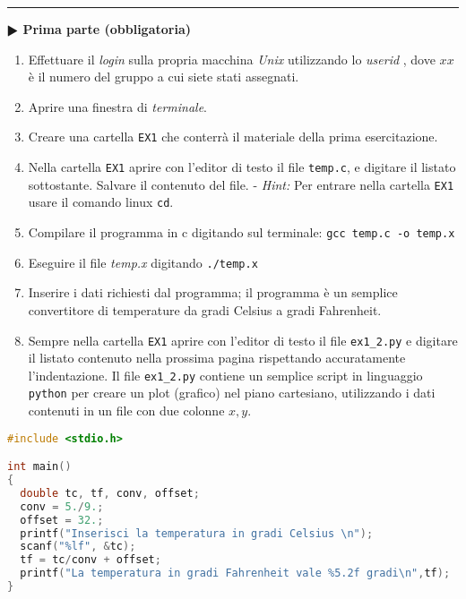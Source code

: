 \documentclass[11pt]{article}
\begin{document}
\hrule
\vspace{2mm}
\textbf{$\RHD$ Prima parte (obbligatoria)} 
\begin{enumerate}
\item Effettuare il {\em login\/} sulla propria macchina {\em Unix\/} utilizzando lo {\em userid\/} \texttt{\login}, 
dove $xx$ \`e il numero del gruppo a cui siete stati assegnati.
\item Aprire una finestra di {\em terminale}.
\item Creare una cartella  \texttt{EX1} che conterr\`a il materiale della prima esercitazione.
\item Nella cartella \texttt{EX1} aprire con l'editor di testo il file \texttt{temp.c}, e digitare il listato sottostante. Salvare il contenuto del file. - {\em Hint:} Per entrare nella cartella \texttt{EX1} usare il comando linux \texttt{cd}.

\item Compilare il programma in c digitando sul terminale:
  \texttt{gcc temp.c -o temp.x}
\item Eseguire il file {\em temp.x\/} digitando \texttt{./temp.x}
\item Inserire i dati richiesti dal programma; il programma \`e un semplice convertitore di temperature da gradi Celsius a gradi Fahrenheit.
\item Sempre nella cartella \texttt{EX1} aprire con l'editor di testo il file \texttt{ex1\_2.py} e digitare il listato
  contenuto nella prossima pagina rispettando accuratamente l'indentazione. Il file \texttt{ex1\_2.py} contiene un
  semplice script in linguaggio \texttt{python} per creare un plot (grafico) nel piano cartesiano, utilizzando i dati contenuti in un file con due colonne $x,y$. 
\end{enumerate}
\begin{lstlisting}[caption={Programma \texttt{temp.c}},language=c]
#include <stdio.h>

int main()
{
  double tc, tf, conv, offset;
  conv = 5./9.;
  offset = 32.;
  printf("Inserisci la temperatura in gradi Celsius \n");
  scanf("%lf", &tc);
  tf = tc/conv + offset;
  printf("La temperatura in gradi Fahrenheit vale %5.2f gradi\n",tf);
}
\end{lstlisting}
\end{document}
